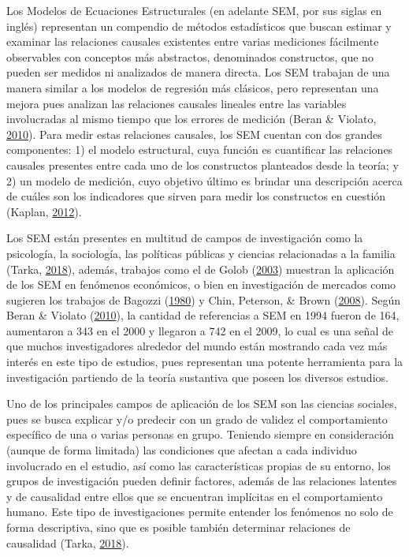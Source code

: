 \documentclass[
  english]{revcoles}
\begin{document}
Los Modelos de Ecuaciones Estructurales (en adelante SEM, por sus siglas
en inglés) representan un compendio de métodos estadísticos que buscan
estimar y examinar las relaciones causales existentes entre varias
mediciones fácilmente observables con conceptos más abstractos,
denominados constructos, que no pueden ser medidos ni analizados de
manera directa. Los SEM trabajan de una manera similar a los modelos de
regresión más clásicos, pero representan una mejora pues analizan las
relaciones causales lineales entre las variables involucradas al mismo
tiempo que los errores de medición (Beran \& Violato,
\protect\hyperlink{ref-Beran2010}{2010}). Para medir estas relaciones
causales, los SEM cuentan con dos grandes componentes: 1) el modelo
estructural, cuya función es cuantificar las relaciones causales
presentes entre cada uno de los constructos planteados desde la teoría;
y 2) un modelo de medición, cuyo objetivo último es brindar una
descripción acerca de cuáles son los indicadores que sirven para medir
los constructos en cuestión (Kaplan,
\protect\hyperlink{ref-Kaplan2012}{2012}).

Los SEM están presentes en multitud de campos de investigación como la
psicología, la sociología, las políticas públicas y ciencias
relacionadas a la familia (Tarka,
\protect\hyperlink{ref-Tarka2018}{2018}), además, trabajos como el de
Golob (\protect\hyperlink{ref-Golob2003}{2003}) muestran la aplicación
de los SEM en fenómenos económicos, o bien en investigación de mercados
como sugieren los trabajos de Bagozzi
(\protect\hyperlink{ref-Bagozzi1980}{1980}) y Chin, Peterson, \& Brown
(\protect\hyperlink{ref-Chin2008}{2008}). Según Beran \& Violato
(\protect\hyperlink{ref-Beran2010}{2010}), la cantidad de referencias a
SEM en 1994 fueron de 164, aumentaron a 343 en el 2000 y llegaron a 742
en el 2009, lo cual es una señal de que muchos investigadores alrededor
del mundo están mostrando cada vez más interés en este tipo de estudios,
pues representan una potente herramienta para la investigación partiendo
de la teoría sustantiva que poseen los diversos estudios.

Uno de los principales campos de aplicación de los SEM son las ciencias
sociales, pues se busca explicar y/o predecir con un grado de validez el
comportamiento específico de una o varias personas en grupo. Teniendo
siempre en consideración (aunque de forma limitada) las condiciones que
afectan a cada individuo involucrado en el estudio, así como las
características propias de su entorno, los grupos de investigación
pueden definir factores, además de las relaciones latentes y de
causalidad entre ellos que se encuentran implícitas en el comportamiento
humano. Este tipo de investigaciones permite entender los fenómenos no
solo de forma descriptiva, sino que es posible también determinar
relaciones de causalidad (Tarka,
\protect\hyperlink{ref-Tarka2018}{2018}).
\end{document}

